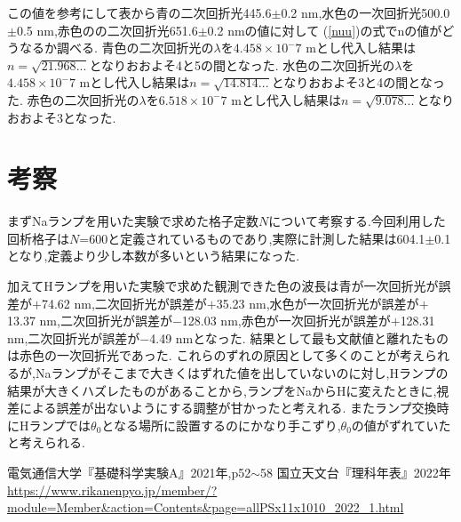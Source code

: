 \documentclass[a4j,10pt]{jarticle}
\begin{document}
  
  この値を参考にして表から青の二次回折光445.6$\pm$0.2 nm,水色の一次回折光500.0$\pm$0.5 nm,赤色のの二次回折光651.6$\pm$0.2 nmの値に対して (\ref{nuu})の式でnの値がどうなるか調べる.
  青色の二次回折光の${\lambda}$を${4.458×10^-7}$ mとし代入し結果は${n=\sqrt{21.968...}}$となりおおよそ4と5の間となった.
  水色の二次回折光の${\lambda}$を${4.458×10^-7}$ mとし代入し結果は${n=\sqrt{14.814...}}$となりおおよそ3と4の間となった.
  赤色の二次回折光の${\lambda}$を${6.518×10^-7}$ mとし代入し結果は${n=\sqrt{9.078...}}$となりおおよそ3となった.

  

  \section{考察}
  まずNaランプを用いた実験で求めた格子定数$N$について考察する.今回利用した回析格子は$N$=600と定義されているものであり,実際に計測した結果は604.1$\pm$0.1となり,定義より少し本数が多いという結果になった.

  加えてHランプを用いた実験で求めた観測できた色の波長は青が一次回折光が誤差が$+$74.62 nm,二次回折光が誤差が$+$35.23 nm,水色が一次回折光が誤差が$+$13.37 nm,二次回折光が誤差が$-$128.03 nm,赤色が一次回折光が誤差が$+$128.31 nm,二次回折光が誤差が$-$4.49 nmとなった.
  結果として最も文献値と離れたものは赤色の一次回折光であった.
  これらのずれの原因として多くのことが考えられるが,Naランプがそこまで大きくはずれた値を出していないのに対し,Hランプの結果が大きくハズレたものがあることから,ランプをNaからHに変えたときに,視差による誤差が出ないようにする調整が甘かったと考えれる.
  またランプ交換時にHランプでは$\theta_0$となる場所に設置するのにかなり手こずり,$\theta_0$の値がずれていたと考えられる.

  \begin{thebibliography}{9}
     電気通信大学『基礎科学実験A』2021年,p52$\sim$58
     国立天文台『理科年表』2022年　　\url{https://www.rikanenpyo.jp/member/?module=Member&action=Contents&page=allPSx11x1010_2022_1.html}
  \end{thebibliography}
\end{document}
